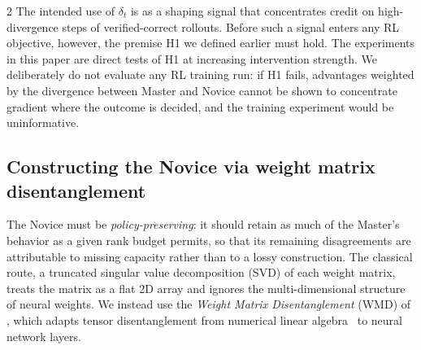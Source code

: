 \documentclass[9pt]{article}
\begin{document}
\begin{multicols}{2}
The intended use of $\delta_t$ is as a shaping signal that concentrates credit
on high-divergence steps of verified-correct rollouts. Before such a signal
enters any RL objective, however, the premise H1 we defined earlier must hold. The experiments in this paper are direct
tests of H1 at increasing intervention strength. We deliberately do not
evaluate any RL training run: if H1 fails, advantages weighted by the divergence between Master and Novice
cannot be shown to concentrate gradient where the outcome is decided, and the training
experiment would be uninformative.

\subsection{Constructing the Novice via weight matrix disentanglement}\label{sec:wmd}

The Novice must be \emph{policy-preserving}: it should retain as much of the
Master's behavior as a given rank budget permits, so that its remaining
disagreements are attributable to missing capacity rather than to a lossy
construction. The classical route, a truncated singular value decomposition
(SVD) of each weight matrix, treats the matrix as a flat 2D
array and ignores the multi-dimensional structure of neural weights. We
instead use the \emph{Weight Matrix Disentanglement} (WMD) of
\citet{till2026introspection}, which adapts tensor disentanglement from
numerical linear algebra~\citep{wei2025tensor} to neural network layers.


\end{multicols}
\end{document}
